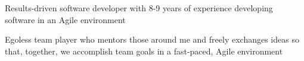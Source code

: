 %
    \begin{itemize*}
        \item Results-driven software developer with 8-9 years of experience developing software in an Agile environment
        \item Egoless team player who mentors those around me and freely exchanges ideas so that, together, we accomplish team goals
            in a fast-paced, Agile environment
    \end{itemize*}
